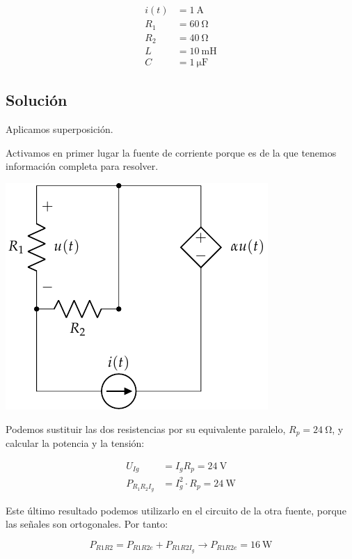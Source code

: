 \documentclass[12pt]{article}
\begin{document}
\begin{align*}
  i(t) &= \SI{1}{\ampere}\\
  R_1 &= \SI{60}{\ohm}\\
  R_2 &= \SI{40}{\ohm}\\
  L &= \SI{10}{\milli\henry}\\
  C &= \SI{1}{\micro\farad}
\end{align*}

\noindent\hrulefill

\subsection*{Solución}

Aplicamos superposición.

Activamos en primer lugar la fuente de corriente porque es de la que tenemos información completa para resolver.

\begin{center}
  \includegraphics{figs/superposicion3_DC}
\end{center}

Podemos sustituir las dos resistencias por su equivalente paralelo, $R_p = \SI{24}{\ohm}$, y calcular la potencia y la tensión:

\begin{align*}
  U_{Ig} &= I_g R_p = \SI{24}{\volt}\\
  P_{R_1R_2I_g} &= I_g^2 \cdot R_p = \SI{24}{\watt}
\end{align*}

Este último resultado podemos utilizarlo en el circuito de la otra fuente, porque las señales son ortogonales. Por tanto:

\begin{equation*}
  P_{R1R2} = P_{R1R2e} + P_{R1R2I_g} \rightarrow P_{R1R2e} = \SI{16}{\watt}
\end{equation*}
\end{document}
